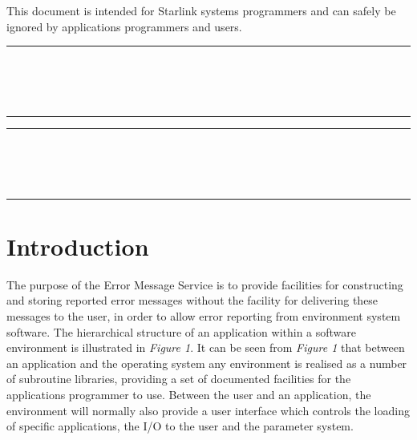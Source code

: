This document is intended for Starlink systems programmers and can safely be
ignored by applications programmers and users.

\newpage
\markright{\stardocname}
\null\vspace {5mm}
\begin {center}
\rule{80mm}{0.5mm} \\ [1ex]
{\Large\bf \stardoctitle \\ [2.5ex]
           \stardocversion} \\ [2ex]
\rule{80mm}{0.5mm}
\end{center}
\vspace{30mm}

\setlength{\parskip}{0mm}
\tableofcontents
\setlength{\parskip}{\medskipamount}

\newpage
\renewcommand{\thepage}{\arabic{page}}
\setcounter{page}{1}

\null\vspace {5mm}
\begin {center}
\rule{80mm}{0.5mm} \\ [1ex]
{\Large\bf \stardoctitle \\ [2.5ex]
           \stardocversion} \\ [2ex]
\rule{80mm}{0.5mm}
\end{center}
\vspace{30mm}

\section {Introduction}

The purpose of the Error Message Service is to provide facilities for
constructing and storing reported  error messages without the facility for
delivering these messages to the user, in order to allow error reporting from 
environment system software.
The hierarchical structure of an application within a software environment 
is illustrated in {\em Figure 1}.
It can be seen from {\em Figure 1} that between an application and the
operating system any environment is realised as a number of subroutine
libraries, providing a set of documented facilities for the applications
programmer to use.
Between the user and an application, the environment will normally also 
provide a user interface which controls the loading of specific applications,
the I/O to the user and the parameter system.

